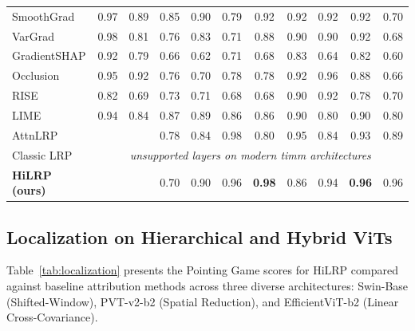 \documentclass[lettersize,journal]{IEEEtran}
\newcommand{\nd}{\textemdash}            %
\begin{document}
\begin{table}[t]
\begin{tabular}{l cc cc cccccc}
    SmoothGrad        & 0.97 & 0.89 & 0.85 & 0.90 & 0.79 & 0.92 & 0.92 & 0.92 & 0.92 & 0.70 \\
    VarGrad           & 0.98 & 0.81 & 0.76 & 0.83 & 0.71 & 0.88 & 0.90 & 0.90 & 0.92 & 0.68 \\
    GradientSHAP      & 0.92 & 0.79 & 0.66 & 0.62 & 0.71 & 0.68 & 0.83 & 0.64 & 0.82 & 0.60 \\
    Occlusion         & 0.95 & 0.92 & 0.76 & 0.70 & 0.78 & 0.78 & 0.92 & 0.96 & 0.88 & 0.66 \\
    RISE              & 0.82 & 0.69 & 0.73 & 0.71 & 0.68 & 0.68 & 0.90 & 0.92 & 0.78 & 0.70 \\
    LIME              & 0.94 & 0.84 & 0.87 & 0.89 & 0.86 & 0.86 & 0.90 & 0.80 & 0.90 & 0.80 \\
    AttnLRP           & \nd & \nd & 0.78 & 0.84 & 0.98 & 0.80 & 0.95 & 0.84 & 0.93 & 0.89 \\
    Classic LRP       & \multicolumn{10}{c}{\emph{unsupported layers on modern timm architectures}} \\
    \midrule
    \textbf{HiLRP (ours)} & \nd & \nd & 0.70 & 0.90 & 0.96 & \textbf{0.98} & 0.86 & 0.94 & \textbf{0.96} & 0.96 \\
    \bottomrule
  \end{tabular}
\end{table}

\subsection{Localization on Hierarchical and Hybrid ViTs}
\label{sec:localization}
Table~\ref{tab:localization} presents the Pointing Game scores for HiLRP compared against baseline attribution methods across three diverse architectures: Swin-Base (Shifted-Window), PVT-v2-b2 (Spatial Reduction), and EfficientViT-b2 (Linear Cross-Covariance).
\end{document}
